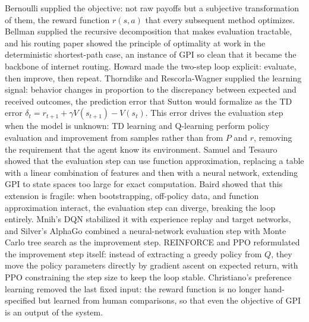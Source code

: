 Bernoulli supplied the objective: not raw payoffs but a subjective transformation of them, the reward function $r(s,a)$ that every subsequent method optimizes. Bellman supplied the recursive decomposition that makes evaluation tractable, and his routing paper showed the principle of optimality at work in the deterministic shortest-path case, an instance of GPI so clean that it became the backbone of internet routing. Howard made the two-step loop explicit: evaluate, then improve, then repeat. Thorndike and Rescorla-Wagner supplied the learning signal: behavior changes in proportion to the discrepancy between expected and received outcomes, the prediction error that Sutton would formalize as the TD error $\delta_t = r_{t+1} + \gamma V(s_{t+1}) - V(s_t)$. This error drives the evaluation step when the model is unknown: TD learning and Q-learning perform policy evaluation and improvement from samples rather than from $P$ and $r$, removing the requirement that the agent know its environment. Samuel and Tesauro showed that the evaluation step can use function approximation, replacing a table with a linear combination of features and then with a neural network, extending GPI to state spaces too large for exact computation. Baird showed that this extension is fragile: when bootstrapping, off-policy data, and function approximation interact, the evaluation step can diverge, breaking the loop entirely. Mnih's DQN stabilized it with experience replay and target networks, and Silver's AlphaGo combined a neural-network evaluation step with Monte Carlo tree search as the improvement step. REINFORCE and PPO reformulated the improvement step itself: instead of extracting a greedy policy from $Q$, they move the policy parameters directly by gradient ascent on expected return, with PPO constraining the step size to keep the loop stable. Christiano's preference learning removed the last fixed input: the reward function is no longer hand-specified but learned from human comparisons, so that even the objective of GPI is an output of the system.

